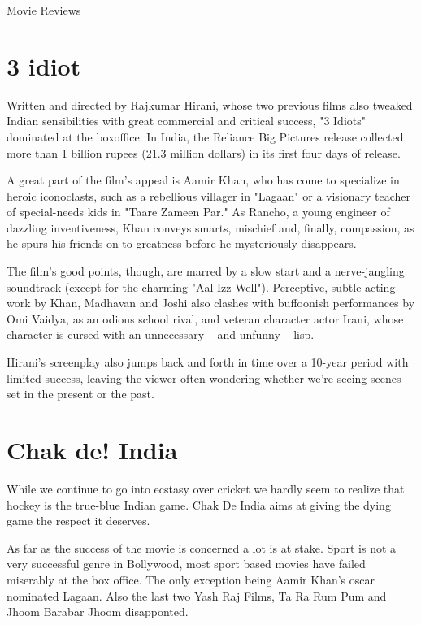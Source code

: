 \documentclass[11pt]{article}
\begin{document}
\begin{center}
\begin{Huge}
Movie Reviews
\end{Huge}
\end{center}
\section*{ 3 idiot }

Written and directed by Rajkumar Hirani, whose two previous films also tweaked Indian sensibilities with great commercial and critical success, "3 Idiots" dominated at the boxoffice. In India, the Reliance Big Pictures release collected more than 1 billion rupees (21.3 million dollars) in its first four days of release.

A great part of the film's appeal is Aamir Khan, who has come to specialize in heroic iconoclasts, such as a rebellious villager in "Lagaan" or a visionary teacher of special-needs kids in "Taare Zameen Par." As Rancho, a young engineer of dazzling inventiveness, Khan conveys smarts, mischief and, finally, compassion, as he spurs his friends on to greatness before he mysteriously disappears.

The film's good points, though, are marred by a slow start and a nerve-jangling soundtrack (except for the charming "Aal Izz Well"). Perceptive, subtle acting work by Khan, Madhavan and Joshi also clashes with buffoonish performances by Omi Vaidya, as an odious school rival, and veteran character actor Irani, whose character is cursed with an unnecessary -- and unfunny -- lisp.


Hirani's screenplay also jumps back and forth in time over a 10-year period with limited success, leaving the viewer often wondering whether we're seeing scenes set in the present or the past.



\section*{ Chak de! India}
While we continue to go into ecstasy over cricket we hardly seem to realize that hockey is the true-blue Indian game. Chak De India aims at giving the dying game the respect it deserves.

As far as the success of the movie is concerned a lot is at stake. Sport is not a very successful genre in Bollywood, most sport based movies have failed miserably at the box office. The only exception being Aamir Khan’s oscar nominated Lagaan. Also the last two Yash Raj Films, Ta Ra Rum Pum and Jhoom Barabar Jhoom disapponted.
\end{document}
